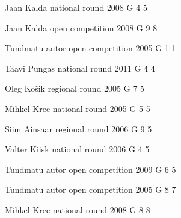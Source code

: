 \documentclass[11pt]{article}
\begin{document}
\ylDisplay{} %
{Jaan Kalda} %
{national round} %
{2008} %
{G 4} %
{5} %
{

\ifEngSolution
\fi
}

\ylDisplay{} %
{Jaan Kalda} %
{open competition} %
{2008} %
{G 9} %
{8} %
{

\ifEngSolution
\fi
}

\ylDisplay{} %
{Tundmatu autor} %
{open competition} %
{2005} %
{G 1} %
{1} %
{

\ifEngSolution
\fi
}

\ylDisplay{} %
{Taavi Pungas} %
{national round} %
{2011} %
{G 4} %
{4} %
{

\ifEngSolution
\fi
}

\ylDisplay{} %
{Oleg Košik} %
{regional round} %
{2005} %
{G 7} %
{5} %
{

\ifEngSolution
\fi
}

\ylDisplay{} %
{Mihkel Kree} %
{national round} %
{2005} %
{G 5} %
{5} %
{

\ifEngSolution
\fi
}

\ylDisplay{} %
{Siim Ainsaar} %
{regional round} %
{2006} %
{G 9} %
{5} %
{

\ifEngSolution
\fi
}

\ylDisplay{} %
{Valter Kiisk} %
{national round} %
{2006} %
{G 4} %
{5} %
{

\ifEngSolution
\fi
}

\ylDisplay{} %
{Tundmatu autor} %
{open competition} %
{2009} %
{G 6} %
{5} %
{

\ifEngSolution
\fi
}

\ylDisplay{} %
{Tundmatu autor} %
{open competition} %
{2005} %
{G 8} %
{7} %
{

\ifEngSolution
\fi
}

\ylDisplay{} %
{Mihkel Kree} %
{national round} %
{2008} %
{G 8} %
{8} %
{

\ifEngSolution
\fi
}
\newpage
\end{document}
